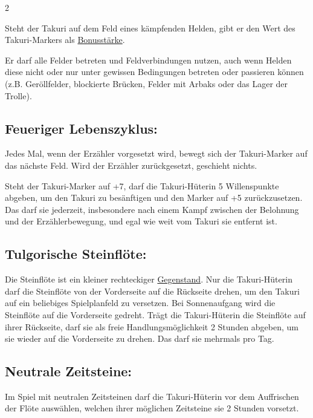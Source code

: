 \documentclass[10pt, a4paper, oneside]{book}
\begin{document}
\begin{multicols*}{2}
\begin{nobgcolor}
Steht der Takuri auf dem Feld eines kämpfenden Helden, gibt er den Wert des Takuri-Markers als \hyperref[bonusstaerke]{Bonusstärke}.
\supercite{mh-takuri}

Er darf alle Felder betreten und Feldverbindungen nutzen, auch wenn Helden diese nicht oder nur unter gewissen Bedingungen betreten oder passieren können (z.B. Geröllfelder, blockierte Brücken, Felder mit Arbaks oder das Lager der Trolle).
\supercite{mh-begleitheft}


\subsection{Feueriger Lebenszyklus:}

Jedes Mal, wenn der Erzähler vorgesetzt wird, bewegt sich der Takuri-Marker auf das nächste Feld. Wird der Erzähler zurückgesetzt, geschieht nichts.
\supercite{mh-begleitheft}

Steht der Takuri-Marker auf +7, darf die Takuri-Hüterin 5 Willenspunkte abgeben, um den Takuri zu besänftigen und den Marker auf +5 zurückzusetzen.
\supercite{mh-takuri}
Das darf sie jederzeit, insbesondere nach einem Kampf zwischen der Belohnung und der Erzählerbewegung\supercite{89455}, und egal wie weit vom Takuri sie entfernt ist.





\subsection{Tulgorische Steinflöte:}

Die Steinflöte ist ein kleiner rechteckiger \hyperref[gegenstaende-und-sonderplaettchen]{Gegenstand}.
Nur die Takuri-Hüterin darf die Steinflöte von der Vorderseite auf die Rückseite drehen, um den Takuri auf ein beliebiges Spielplanfeld zu versetzen.
Bei Sonnenaufgang wird die Steinflöte auf die Vorderseite gedreht.
Trägt die Takuri-Hüterin die Steinflöte auf ihrer Rückseite, darf sie als freie Handlungsmöglichkeit 2 Stunden abgeben, um sie wieder auf die Vorderseite zu drehen. Das darf sie mehrmals pro Tag.
\supercite{mh-begleitheft}



\subsection{Neutrale Zeitsteine:}

Im Spiel mit neutralen Zeitsteinen darf die Takuri-Hüterin vor dem Auffrischen der Flöte auswählen, welchen ihrer möglichen Zeitsteine sie 2 Stunden vorsetzt.




\end{nobgcolor}
\end{multicols*}
\end{document}

